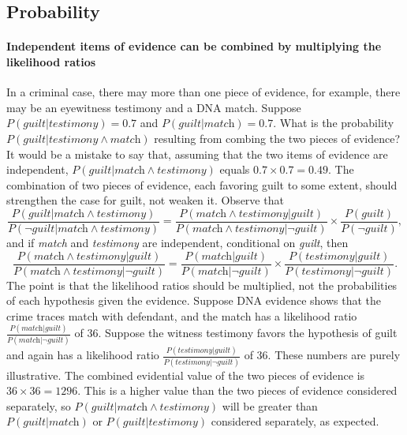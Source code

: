 \documentclass[10pt]{article}
\begin{document}
\subsection{Probability}


\paragraph{Independent items of evidence can be combined by multiplying the likelihood ratios}

In a criminal case, there may more than one piece of evidence, for example, 
there may be an eyewitness testimony and a DNA match. 
Suppose $P(\textit{guilt}| \textit{testimony})=0.7$
and $P(\textit{guilt} | \textit{match})=0.7$. What is the probability 
$P(\textit{guilt}| \textit{testimony} \wedge \textit{match})$ resulting 
from combing the two pieces of evidence? It would be a mistake to say that, assuming that 
the two items of evidence are independent, $P(\textit{guilt}| \textit{match} \wedge \textit{testimony})$ equals 
$0.7\times 0.7=0.49$. %
The combination of two pieces of evidence, each favoring guilt to some extent, should strengthen the case for guilt, 
not weaken it. Observe that 
\[\frac{P(\textit{guilt} | \textit{match}\wedge \textit{testimony})}{P(\neg \textit{guilt} | \textit{match}\wedge \textit{testimony})}=\frac{P(\textit{match}\wedge \textit{testimony} | \textit{guilt})}{P(\textit{match}\wedge \textit{testimony} | \neg \textit{guilt})}\times \frac{P(\textit{guilt})}{P(\neg \textit{guilt})},\]
 and if \textit{match} and \textit{testimony} are independent, conditional on \textit{guilt}, then 
\[\frac{P(\textit{match}\wedge \textit{testimony} | \textit{guilt})}{P(\textit{match}\wedge \textit{testimony} | \neg \textit{guilt})}=\frac{P(\textit{match}| \textit{guilt})}{P(\textit{match}|\neg \textit{guilt})}\times\frac{P(\textit{testimony} | \textit{guilt})}{P(\textit{testimony} | \neg \textit{guilt})}.\]
%
%
%
The point is that the likelihood ratios should be multiplied, not the probabilities of each hypothesis given the evidence. 
Suppose DNA evidence shows that the crime traces match with defendant, and 
the match has a likelihood ratio $\frac{P(\textit{match} | \textit{guilt})}{P(\textit{match}| \neg \textit{guilt})}$ of 36. 
Suppose the witness testimony favors the hypothesis of guilt and again has a likelihood ratio $\frac{P(\textit{testimony} | \textit{guilt})}{P(\textit{testimony}| \neg \textit{guilt})}$ of 36.
These numbers are purely illustrative. The combined evidential value of the two pieces of evidence is $36\times 36=1296$. 
This is a higher value than the two pieces of evidence considered separately, so 
$P(\textit{guilt}| \textit{match} \wedge \textit{testimony})$ will be greater than $P(\textit{guilt}| \textit{match})$ 
or $P(\textit{guilt}| \textit{testimony})$ considered separately, as expected. 
 
\end{document}
